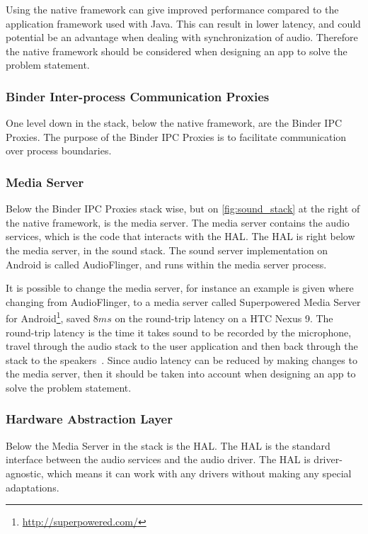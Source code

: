 Using the native framework can give improved performance compared to the application framework used with Java\cite{nat_perf_2}.
This can result in lower latency, and could potential be an advantage when dealing with synchronization of audio.
Therefore the native framework should be considered when designing an app to solve the problem statement.

\subsubsection*{Binder Inter-process Communication Proxies}
One level down in the stack, below the native framework, are the Binder \ac{IPC} Proxies.
The purpose of the Binder \ac{IPC} Proxies is to facilitate communication over process boundaries.

\subsubsection*{Media Server}
Below the Binder \ac{IPC} Proxies stack wise, but on \cref{fig:sound_stack} at the right of the native framework, is the media server.
The media server contains the audio services, which is the code that interacts with the \ac{HAL}.
The \ac{HAL} is right below the media server, in the sound stack.
The sound server implementation on Android is called AudioFlinger, and runs within the media server process\cite{audioflinger}.

It is possible to change the media server,
for instance an example is given where changing from AudioFlinger, to a media server called Superpowered Media Server for Android\footnote{\url{http://superpowered.com/}}, saved $8 ms$ on the round-trip latency on a HTC Nexus 9\cite{superpowered_8ms}.
The round-trip latency is the time it takes sound to be recorded by the microphone,
travel through the audio stack to the user application and then back through the stack to the speakers~\cite{superpowered_8ms}.
Since audio latency can be reduced by making changes to the media server,
then it should be taken into account when designing an app to solve the problem statement.

\subsubsection*{Hardware Abstraction Layer}
Below the Media Server in the stack is the \ac{HAL}.
The \ac{HAL} is the standard interface between the audio services and the audio driver.
The \ac{HAL} is driver-agnostic, which means it can work with any drivers without making any special adaptations.

